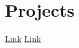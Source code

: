 \documentclass{resumecustom}%
\begin{document}
\begin{minipage}[t]{0.66\textwidth}
\section{Projects}%
%
 \textbar{} \href{youtube.com}{Link}
%
\vspace{\topsep}%
\sectionsep%
%
 \textbar{} \href{gogole.com}{Link}
%
\vspace{\topsep}%
\sectionsep%
\end{minipage}%
\end{document}
